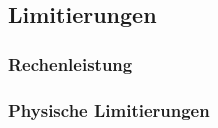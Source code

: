 \subsection{Limitierungen}
\label{subsec:limitierungen}

\subsubsection{Rechenleistung}
\subsubsection{Physische Limitierungen}

